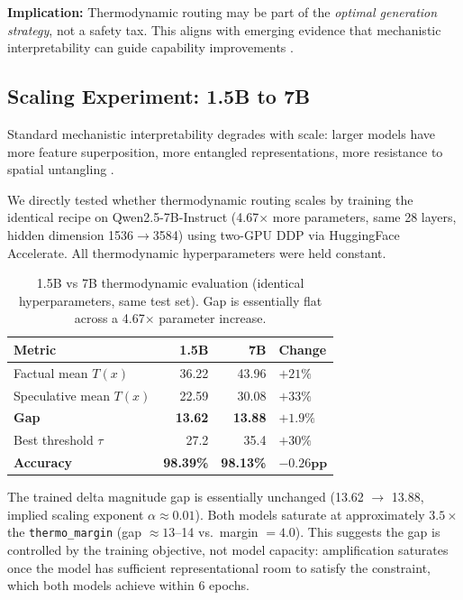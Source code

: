 \documentclass[11pt,a4paper]{article}
\begin{document}
\textbf{Implication:} Thermodynamic routing may be part of the \emph{optimal generation strategy}, not a safety tax. This aligns with emerging evidence that mechanistic interpretability can guide capability improvements \citep{elhage2021mathematical}.

\subsection{Scaling Experiment: 1.5B to 7B}

Standard mechanistic interpretability degrades with scale: larger models have more feature superposition, more entangled representations, more resistance to spatial untangling \citep{elhage2022superposition}.

We directly tested whether thermodynamic routing scales by training the identical recipe on Qwen2.5-7B-Instruct (4.67$\times$ more parameters, same 28 layers, hidden dimension 1536$\rightarrow$3584) using two-GPU DDP via HuggingFace Accelerate. All thermodynamic hyperparameters were held constant.

\begin{table}[h]
\centering
\small
\begin{tabular}{lrrl}
\toprule
Metric & 1.5B & 7B & Change \\
\midrule
Factual mean $T(x)$ & 36.22 & 43.96 & $+21\%$ \\
Speculative mean $T(x)$ & 22.59 & 30.08 & $+33\%$ \\
\textbf{Gap} & \textbf{13.62} & \textbf{13.88} & $\mathbf{+1.9\%}$ \\
Best threshold $\tau$ & 27.2 & 35.4 & $+30\%$ \\
\textbf{Accuracy} & \textbf{98.39\%} & \textbf{98.13\%} & $\mathbf{-0.26\text{pp}}$ \\
\bottomrule
\end{tabular}
\caption{1.5B vs 7B thermodynamic evaluation (identical hyperparameters, same test set). Gap is essentially flat across a 4.67$\times$ parameter increase.}
\end{table}

The trained delta magnitude gap is essentially unchanged (13.62 $\rightarrow$ 13.88, implied scaling exponent $\alpha \approx 0.01$). Both models saturate at approximately $3.5\times$ the \texttt{thermo\_margin} (gap $\approx 13$--14 vs.\ margin $= 4.0$). This suggests the gap is controlled by the training objective, not model capacity: amplification saturates once the model has sufficient representational room to satisfy the constraint, which both models achieve within 6 epochs.
\end{document}
